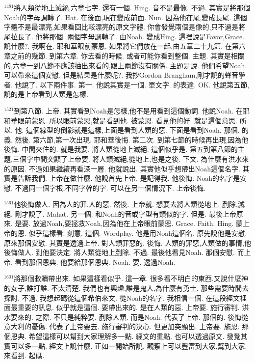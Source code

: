 \documentclass{book}
\begin{document}
$^{1481}$將人類從地上滅絕,六章七字.
還有一個.
Hing.
音不是最像.
不過.
其實是將那個Noah的字母調轉了.
Hat.
在後面,現在變成前面.
Nun.
因為他在尾,變成長尾.
這個字體不是最漂亮,如果看回比較漂亮的原文字體.
你會發覺兩個是像的,只不過是將尾拉長了.
他將那個.
兩個字母調轉了.
由Noah.
變成Hing.
這裡說是Favor,Grace.
說什麼?.
我啊在.
耶和華眼前蒙恩.
如果將它們放在一起,由五章二十九節.
在第六章之前的幾節.
到第六章.
你去看的時候.
或者可能你看到整個.
主題.
其實是相關的,六章一到八節不應該抽出來看的,跟上兩節沒有關係.
主題是說.
他們希望Noah.
可以帶來這個安慰.
但是結果是什麼呢?.
我抄Gordon Brangham,剛才說的聲音學者.
他說了.
以下兩件事.
第一.
他說其實是一個.
單文字.
的表達.
OK.
他說第五節,說的是上帝看到人類是怎樣.

$^{1521}$到第八節.
上帝.
其實看到Noah是怎樣,他不是用看到這個動詞.
他說Noah.
在耶和華眼前蒙恩.
所以眼前蒙恩,就是看到他.
被蒙恩.
看見他的好.
就是這個意思.
所以.
他.
這個線型的倒影就是這樣,上面是看到人類的惡.
下面是看到Noah.
那個.
的義.
然後.
第六節,第一次出現.
耶和華後悔.
第二次.
到第七節的時候再出現,因為他後悔.
中間夾住的.
就是我要.
將人類從地上滅絕.
這個似乎是.
第五到第八節的主題,三個字中間突顯了上帝要.
將人類滅絕,從地上,也是之後.
下文.
為什麼有洪水來的原因.
不過如果繼續再看深一層.
他就說出.
其實他似乎想帶出Noah這個名字.
其實是告訴我們.
上帝在做什麼.
他說首先上帝.
是記得我.
他後悔.
Noah的名字是安慰.
不過同一個字根,不同字幹的字.
可以在另一個情況下.
上帝後悔.

$^{1561}$他後悔做人.
因為人的罪,人的惡.
然後.
上帝就.
想要去將人類從地上.
剷除,滅絕.
剛才說了.
Mahat.
另一個.
和Noah的音或字型有類似的字.
但是.
最後上帝原來.
是要.
放過Noah,要拯救Noah,因為他在上帝眼前蒙恩.
Grace.
Faith.
Hing.
蒙上帝的恩.
似乎這樣看.
刻意.
這個.
Wordplay.
他是用Noah這個名.
原先說他是安慰.
原來那個安慰.
其實是透過上帝.
對人類罪惡的.
後悔.
人類的罪惡,人類做的事情,他後悔做人.
到他要決定.
將人類從地上剷除.
不過.
最後他看見Noah.
那個安慰.
而上帝.
看到那個恩典.
他要給那個恩典.
Noah.
要.
透過Noah.

$^{1601}$將那個救贖帶出來.
如果這樣看似乎.
這一章.
很多看不明白的東西,又說什麼神的女子,誰打誰.
不太清楚.
我們也有興趣,誰是鬼人,為什麼有勇士.
那些需要時間去探討.
不過.
我想起碼從這個希伯來文.
從Noah的名字.
我相信一個.
在這段經文裡面最重要的訊息.
似乎就是這個.
要帶出來的.
是在人類的惡.
上帝要.
施行審判.
洪水要來的.
之際.
不只是純粹要.
剷除人類.
而是Noah.
代表了上帝.
那個的.
後悔從意大利的憂傷.
代表了上帝要去.
施行審判的決心.
但更加突顯出.
上帝要.
施恩.
那個恩典.
希望這樣可以幫到大家理解多一點.
經文的重點.
也可以透過原文.
發覺其實可以多一點.
經文上說什麼.
正如一開始所說.
觀察上可以豐富到大家,幫到大家.
來看到.
起碼.
\end{document}

